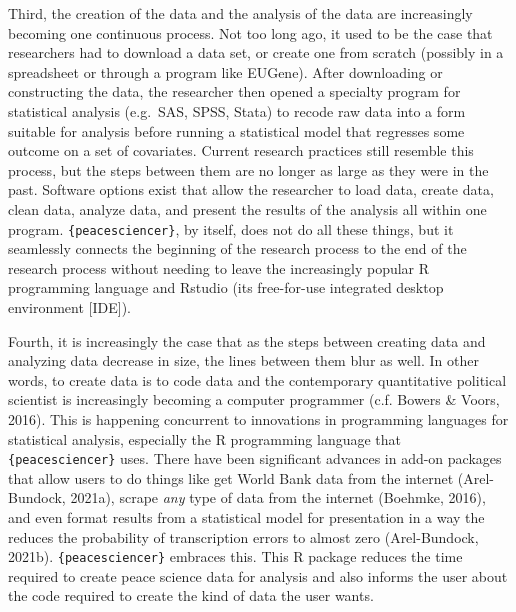 \documentclass[
  11pt,
]{article}
\begin{document}
Third, the creation of the data and the analysis of the data are increasingly becoming one continuous process. Not too long ago, it used to be the case that researchers had to download a data set, or create one from scratch (possibly in a spreadsheet or through a program like EUGene). After downloading or constructing the data, the researcher then opened a specialty program for statistical analysis (e.g.~SAS, SPSS, Stata) to recode raw data into a form suitable for analysis before running a statistical model that regresses some outcome on a set of covariates. Current research practices still resemble this process, but the steps between them are no longer as large as they were in the past. Software options exist that allow the researcher to load data, create data, clean data, analyze data, and present the results of the analysis all within one program. \texttt{\{peacesciencer\}}, by itself, does not do all these things, but it seamlessly connects the beginning of the research process to the end of the research process without needing to leave the increasingly popular R programming language and Rstudio (its free-for-use integrated desktop environment {[}IDE{]}).

Fourth, it is increasingly the case that as the steps between creating data and analyzing data decrease in size, the lines between them blur as well. In other words, to create data is to code data and the contemporary quantitative political scientist is increasingly becoming a computer programmer (c.f. Bowers \& Voors, 2016). This is happening concurrent to innovations in programming languages for statistical analysis, especially the R programming language that \texttt{\{peacesciencer\}} uses. There have been significant advances in add-on packages that allow users to do things like get World Bank data from the internet (Arel-Bundock, 2021a), scrape \emph{any} type of data from the internet (Boehmke, 2016), and even format results from a statistical model for presentation in a way the reduces the probability of transcription errors to almost zero (Arel-Bundock, 2021b). \texttt{\{peacesciencer\}} embraces this. This R package reduces the time required to create peace science data for analysis and also informs the user about the code required to create the kind of data the user wants.
\end{document}
